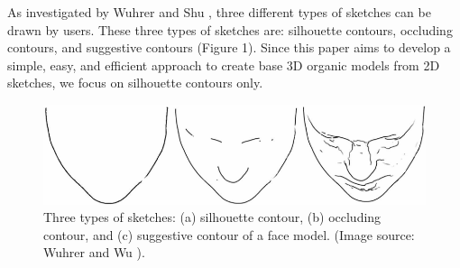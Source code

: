 \documentclass[runningheads]{llncs}
\begin{document}
As investigated by Wuhrer and Shu \cite{Wuhrer2012Shape}, three different types of sketches can be drawn by users. These three types of sketches are: silhouette contours, occluding contours, and suggestive contours (Figure 1). Since this paper aims to develop a simple, easy, and efficient approach to create base 3D organic models from 2D sketches, we focus on silhouette contours only.\\

\begin{figure}
\includegraphics[width=\textwidth]{6233147-fig-1-source-large.png}
\caption{Three types of sketches: (a) silhouette contour, (b) occluding contour, and (c) suggestive contour of a face model. (Image source: Wuhrer and Wu \cite{Wuhrer2012Shape}).} 
\end{figure}
\end{document}
